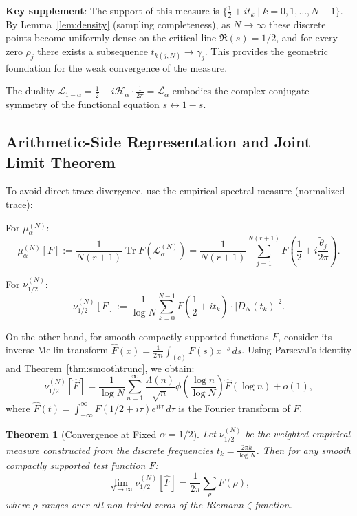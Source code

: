 \documentclass[12pt,a4paper]{amsart}
\theoremstyle{plain}
\newtheorem{theorem}{Theorem}[section]
\theoremstyle{definition}
\theoremstyle{remark}
\begin{document}
\textbf{Key supplement}: The support of this measure is $\{\frac{1}{2} + i t_k \mid k=0,1,\dots,N-1\}$. By Lemma~\ref{lem:density} (sampling completeness), as $N\to\infty$ these discrete points become uniformly dense on the critical line $\Re(s)=1/2$, and for every zero $\rho_j$ there exists a subsequence $t_{k(j,N)} \to \gamma_j$. This provides the geometric foundation for the weak convergence of the measure.

The duality $\mathcal{L}_{1-\alpha} = \frac{1}{2} - i\mathcal{H}_\alpha \cdot \frac{1}{2\pi} = \overline{\mathcal{L}_\alpha}$ embodies the complex-conjugate symmetry of the functional equation $s\leftrightarrow 1-s$.

\subsection{Arithmetic-Side Representation and Joint Limit Theorem}

To avoid direct trace divergence, use the empirical spectral measure (normalized trace):

For $\mu_\alpha^{(N)}$:
\[
\mu_\alpha^{(N)}[F] := \frac{1}{N(r+1)}\operatorname{Tr} F(\mathcal{L}_\alpha^{(N)}) = \frac{1}{N(r+1)}\sum_{j=1}^{N(r+1)} F\left(\frac{1}{2}+i\frac{\tilde{\theta}_j}{2\pi}\right).
\]

For $\nu_{1/2}^{(N)}$:
\[
\nu_{1/2}^{(N)}[F] := \frac{1}{\log N}\sum_{k=0}^{N-1} F\left(\frac{1}{2}+it_k\right) \cdot |D_N(t_k)|^2.
\]

On the other hand, for smooth compactly supported functions $F$, consider its inverse Mellin transform $\hat{F}(x)=\frac{1}{2\pi i}\int_{(c)} F(s) x^{-s}\,ds$. Using Parseval's identity and Theorem~\ref{thm:smoothtrunc}, we obtain:
\[
\nu_{1/2}^{(N)}[\widehat{F}] = \frac{1}{\log N}\sum_{n=1}^\infty \frac{\Lambda(n)}{\sqrt{n}}\phi\left(\frac{\log n}{\log N}\right)\widehat{F}(\log n) + o(1),
\]
where $\widehat{F}(t) = \int_{-\infty}^\infty F(1/2+i\tau) e^{it\tau}\, d\tau$ is the Fourier transform of $F$.

\begin{theorem}[Convergence at Fixed $\alpha=1/2$]\label{thm:weilconv}
Let $\nu_{1/2}^{(N)}$ be the weighted empirical measure constructed from the discrete frequencies $t_k = \frac{2\pi k}{\log N}$. Then for any smooth compactly supported test function $F$:
\[
\lim_{N\to\infty} \nu_{1/2}^{(N)}[\widehat{F}] = \frac{1}{2\pi} \sum_{\rho} F(\rho),
\]
where $\rho$ ranges over all non-trivial zeros of the Riemann $\zeta$ function.
\end{theorem}
\end{document}
